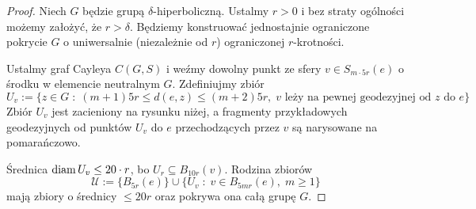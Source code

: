 \begin{proof}
  Niech $G$ będzie grupą $\delta$-hiperboliczną. Ustalmy $r>0$ i bez straty ogólności możemy założyć, że $r>\delta$. Będziemy konstruować jednostajnie ograniczone pokrycie $G$ o uniwersalnie (niezależnie od $r$) ograniczonej $r$-krotności.

  Ustalmy graf Cayleya $C(G,S)$ i weźmy dowolny punkt ze sfery $v\in S_{m\cdot 5r}(e)$ o środku w elemencie neutralnym $G$. Zdefiniujmy zbiór 
  $$U_v:=\{z\in G\;:\;(m+1)5r\leq d(e, z)\leq (m+2)5r,\;v\text{ leży na pewnej geodezyjnej od }z \text{ do }e\}$$
  Zbiór $U_v$ jest zacieniony na rysunku niżej, a fragmenty przykładowych geodezyjnych od punktów $U_v$ do $e$ przechodzących przez $v$ są narysowane na pomarańczowo.
  \begin{center}
  \end{center}

  Średnica $\operatorname{diam} U_v\leq 20\cdot r$, bo $U_r\subseteq B_{10r}(v)$. Rodzina zbiorów
  $$\mathcal{U}:=\{B_{5r}(e)\}\cup \{U_v\;:\;v\in B_{5mr}(e),\;m\geq 1\}$$
  mają zbiory o średnicy $\leq 20r$ oraz pokrywa ona całą grupę $G$.


\end{proof}
